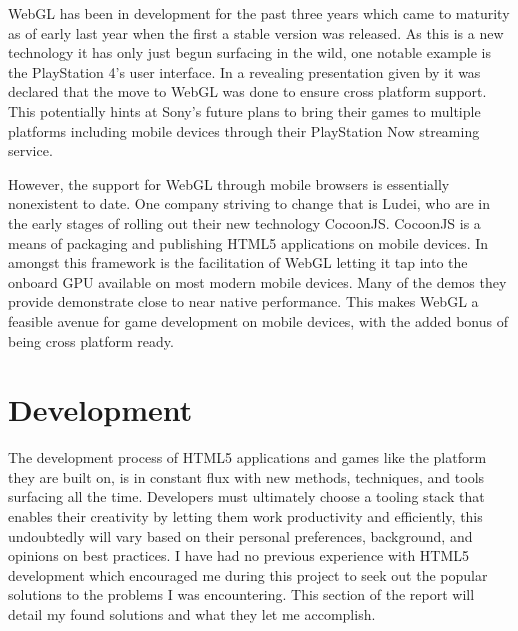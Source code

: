 \documentclass[final]{cmpreport}
\begin{document}
WebGL has been in development for the past three years which came to maturity as of early last year when the first a stable version was released. As this is a new technology it has only just begun surfacing in the wild, one notable example is the PlayStation 4's user interface. In a revealing presentation given by \cite{Olmstead} it was declared that the move to WebGL was done to ensure cross platform support. This potentially hints at Sony's future plans to bring their games to multiple platforms including mobile devices through their PlayStation Now streaming service.

However, the support for WebGL through mobile browsers is essentially nonexistent to date. One company striving to change that is Ludei, who are in the early stages of rolling out their new technology CocoonJS. CocoonJS is a means of packaging and publishing HTML5 applications on mobile devices. In amongst this framework is the facilitation of WebGL letting it tap into the onboard GPU available on most modern mobile devices. Many of the demos they provide demonstrate close to near native performance. This makes WebGL a feasible avenue for game development on mobile devices, with the added bonus of being cross platform ready.

\section{Development}
The development process of HTML5 applications and games like the platform they are built on, is in constant flux with new methods, techniques, and tools surfacing all the time. Developers must ultimately choose a tooling stack that enables their creativity by letting them work productivity and efficiently, this undoubtedly will vary based on their personal preferences, background, and opinions on best practices. I have had no previous experience with HTML5 development which encouraged me during this project to seek out the popular solutions to the problems I was encountering. This section of the report will detail my found solutions and what they let me accomplish. 
\end{document}
